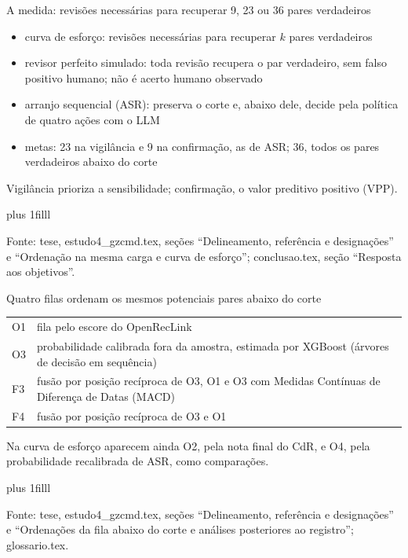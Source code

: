 \documentclass[aspectratio=169,11pt]{beamer}
\let\ressalvatexto\relax
\newcommand{\fontealign}{\raggedright}
\newcommand{\fonte}[2][tese, ]{\par\vskip 0pt plus 1filll
  \ifx\ressalvatexto\relax\else{\raggedright\footnotesize\color{black!70}\textit{Ressalva:} \ressalvatexto\par}\vskip 3pt\fi
  {\fontealign\tiny\color{black!65}Fonte: #1#2.\par}\vskip 3pt\global\let\ressalvatexto\relax}
\newcommand{\itens}[1]{\begin{itemize}#1\end{itemize}}
\begin{document}
\begin{frame}[label=S09]{A medida: revisões necessárias para recuperar 9, 23 ou 36 pares verdadeiros}
\small
\itens{\item curva de esforço: revisões necessárias para recuperar $k$ pares verdadeiros
\item revisor perfeito simulado: toda revisão recupera o par verdadeiro, sem falso positivo humano; não é acerto humano observado
\item arranjo sequencial (ASR): preserva o corte e, abaixo dele, decide pela política de quatro ações com o LLM
\item metas: 23 na vigilância e 9 na confirmação, as de ASR; 36, todos os pares verdadeiros abaixo do corte}
Vigilância prioriza a sensibilidade; confirmação, o valor preditivo positivo (VPP).
\fonte{estudo4\_gzcmd.tex, seções ``Delineamento, referência e designações'' e ``Ordenação na mesma carga e curva de esforço''; conclusao.tex, seção ``Resposta aos objetivos''}
\end{frame}

\begin{frame}[label=S10]{Quatro filas ordenam os mesmos potenciais pares abaixo do corte}
\small
\renewcommand{\arraystretch}{1.5}
\begin{tabular}{@{}lL{.86\textwidth}@{}}
O1 & fila pelo escore do OpenRecLink \\
O3 & probabilidade calibrada fora da amostra, estimada por XGBoost (árvores de decisão em sequência) \\
F3 & fusão por posição recíproca de O3, O1 e O3 com Medidas Contínuas de Diferença de Datas (MACD) \\
F4 & fusão por posição recíproca de O3 e O1 \\
\end{tabular}

\medskip
Na curva de esforço aparecem ainda O2, pela nota final do CdR, e O4, pela probabilidade recalibrada de ASR, como comparações.
\fonte{estudo4\_gzcmd.tex, seções ``Delineamento, referência e designações'' e ``Ordenações da fila abaixo do corte e análises posteriores ao registro''; glossario.tex}
\end{frame}
\end{document}
